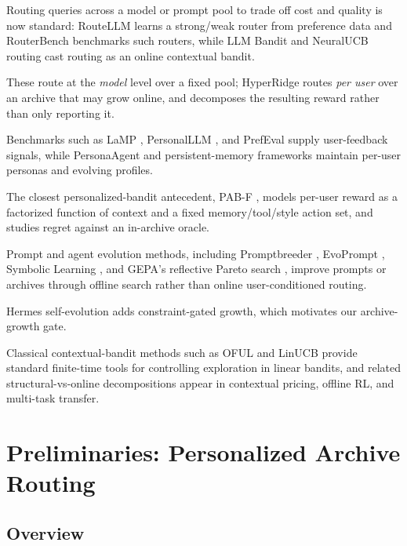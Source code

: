 \documentclass{article} %
\begin{document}
\label{sec:related}

Routing queries across a model or prompt pool to trade off cost and quality is now standard: RouteLLM \citep{ong2024routellm} learns a strong/weak router from preference data and RouterBench \citep{hu2024routerbench} benchmarks such routers, while LLM Bandit \citep{li2025llmbandit} and NeuralUCB routing \citep{tsai2026neuralucb} cast routing as an online contextual bandit.

These route at the \emph{model} level over a fixed pool; HyperRidge routes \emph{per user} over an archive that may grow online, and decomposes the resulting reward rather than only reporting it.

Benchmarks such as LaMP \citep{salemi2023lamp}, PersonalLLM \citep{zollo2024personalllm}, and PrefEval \citep{zhao2025prefeval} supply user-feedback signals, while PersonaAgent \citep{zhang2025personaagent} and persistent-memory frameworks \citep{westhausser2025persistent} maintain per-user personas and evolving profiles.

The closest personalized-bandit antecedent, PAB-F \citep{jin2026personalizing}, models per-user reward as a factorized function of context and a fixed memory/tool/style action set, and studies regret against an in-archive oracle.

Prompt and agent evolution methods, including Promptbreeder \citep{fernando2023promptbreeder}, EvoPrompt \citep{guo2024evoprompt}, Symbolic Learning \citep{zhou2024symbolic}, and GEPA's reflective Pareto search \citep{agrawal2025geparp}, improve prompts or archives through offline search rather than online user-conditioned routing.

Hermes self-evolution \citep{hermes_selfevolution,hermes_agent} adds constraint-gated growth, which motivates our archive-growth gate.

Classical contextual-bandit methods such as OFUL and LinUCB \citep{abbasi2011oful,chu2011linucb,li2010contextual} provide standard finite-time tools for controlling exploration in linear bandits, and related structural-vs-online decompositions appear in contextual pricing, offline RL, and multi-task transfer.

\section{Preliminaries: Personalized Archive Routing}
\label{sec:background}

\subsection{Overview}
\end{document}
